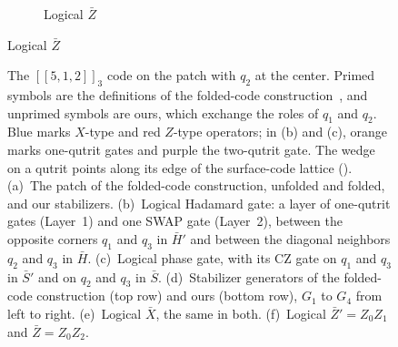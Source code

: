 \begin{figure}[tp]
\begin{subfigure}[c]{0.6\textwidth}
\caption{Logical $\bar Z$}
\end{subfigure}
\end{figure}

\begin{figure}[tp]\ContinuedFloat
\centering
\caption{The $[[5,1,2]]_3$ code on the patch with $q_2$ at the center. Primed symbols are the definitions of the folded-code construction~\cite{Moussa2016}, and unprimed symbols are ours, which exchange the roles of $q_1$ and $q_2$. Blue marks $X$-type and red $Z$-type operators; in (b) and (c), orange marks one-qutrit gates and purple the two-qutrit gate. The wedge on a qutrit points along its edge of the surface-code lattice ().
(a)~The patch of the folded-code construction, unfolded and folded, and our stabilizers.
(b)~Logical Hadamard gate: a layer of one-qutrit gates (Layer~1) and one SWAP gate (Layer~2), between the opposite corners $q_1$ and $q_3$ in $\bar H'$ and between the diagonal neighbors $q_2$ and $q_3$ in $\bar H$.
(c)~Logical phase gate, with its CZ gate on $q_1$ and $q_3$ in $\bar S'$ and on $q_2$ and $q_3$ in $\bar S$.
(d)~Stabilizer generators of the folded-code construction (top row) and ours (bottom row), $G_1$ to $G_4$ from left to right.
(e)~Logical $\bar X$, the same in both.
(f)~Logical $\bar Z' = Z_0 Z_1$ and $\bar Z = Z_0 Z_2$.}
\label{fig: 5-qutrit-code}

\end{figure}
